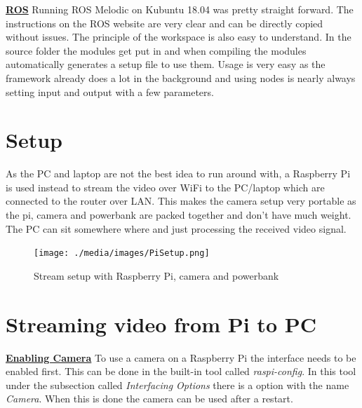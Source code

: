 \textbf{\underline{ROS}} \newline
Running ROS Melodic on Kubuntu 18.04 was pretty straight forward. The instructions on the ROS website are very clear and can be directly copied without issues. The principle of the workspace is also easy to understand. In the source folder the modules get put in and when compiling the modules automatically generates a setup file to use them. Usage is very easy as the framework already does a lot in the background and using nodes is nearly always setting input and output with a few parameters.

\section{Setup\authorA}
As the PC and laptop are not the best idea to run around with, a Raspberry Pi is used instead to stream the video over WiFi to the PC/laptop which are connected to the router over LAN. This makes the camera setup very portable as the pi, camera and powerbank are packed together and don't have much weight. The PC can sit somewhere where and just processing the received video signal.
\begin{figure}[h]
	\centering
	\texttt{[image: ./media/images/PiSetup.png]}
  	\caption{Stream setup with Raspberry Pi, camera and powerbank}
  	\label{picamssetup}
\end{figure}

\section{Streaming video from Pi to PC\authorA}

\textbf{\underline{Enabling Camera}}\newline
To use a camera on a Raspberry Pi the interface needs to be enabled first. This can be done in the built-in tool called \textit{raspi-config}. In this tool under the subsection called \textit{Interfacing Options} there is a option with the name \textit{Camera}. When this is done the camera can be used after a restart.

